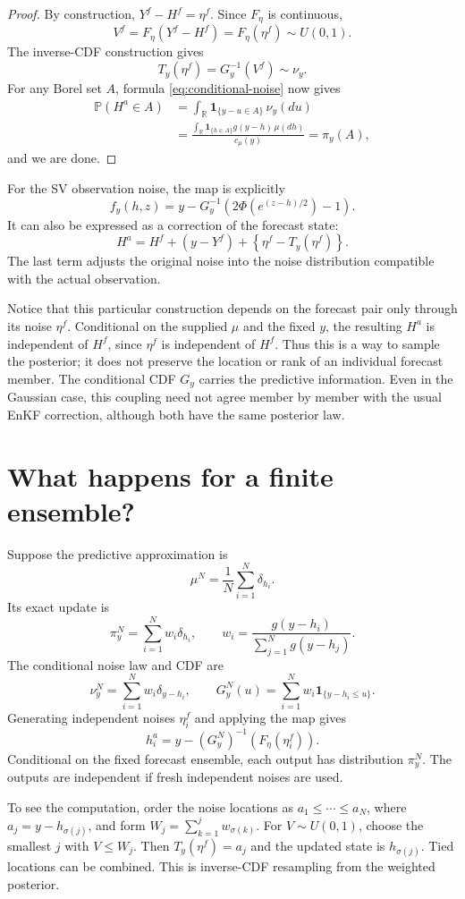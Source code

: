 \documentclass[11pt]{article}
\newcommand{\Pp}{\mathbb P}
\newcommand{\R}{\mathbb R}
\newcommand{\ind}{\mathbf 1}
\begin{document}
\begin{proof}
By construction, $Y^f-H^f=\eta^f$. Since $F_\eta$ is continuous,
\[
V^f=F_\eta(Y^f-H^f)=F_\eta(\eta^f)\sim U(0,1).
\]
The inverse-CDF construction gives
\[
T_y(\eta^f)=G_y^{-1}(V^f)\sim\nu_y.
\]
For any Borel set $A$, formula \eqref{eq:conditional-noise} now gives
\begin{align*}
\Pp(H^a\in A)
&=\int_\R\ind_{\{y-u\in A\}}\,\nu_y(du)\\
&=\frac{\int_\R
\ind_{\{h\in A\}}g(y-h)\,\mu(dh)}{c_\mu(y)}
=\pi_y(A),
\end{align*}
and we are done.
\end{proof}

For the SV observation noise, the map is explicitly
\[
f_y(h,z)
=y-G_y^{-1}\left(2\Phi(e^{(z-h)/2})-1\right).
\]
It can also be expressed as a correction of the forecast state:
\[
H^a
=H^f+(y-Y^f)
+\left\{\eta^f-T_y(\eta^f)\right\}.
\]
The last term adjusts the original noise into the noise distribution
compatible with the actual observation.

Notice that this particular construction depends on the forecast pair
only through its noise $\eta^f$. Conditional on the supplied $\mu$ and
the fixed $y$, the resulting $H^a$ is independent of $H^f$, since $\eta^f$
is independent of $H^f$. Thus this is a way to sample the posterior;
it does not preserve the location or rank of an individual forecast member.
The conditional CDF $G_y$ carries the predictive information. Even in
the Gaussian case, this coupling need not agree member by member with
the usual EnKF correction, although both have the same posterior law.

\section{What happens for a finite ensemble?}

Suppose the predictive approximation is
\[
\mu^N=\frac1N\sum_{i=1}^N\delta_{h_i}.
\]
Its exact update is
\[
\pi_y^N=\sum_{i=1}^N w_i\delta_{h_i},\qquad
w_i=\frac{g(y-h_i)}{\sum_{j=1}^N g(y-h_j)}.
\]
The conditional noise law and CDF are
\[
\nu_y^N=\sum_{i=1}^N w_i\delta_{y-h_i},\qquad
G_y^N(u)=\sum_{i=1}^N w_i\ind_{\{y-h_i\le u\}}.
\]
Generating independent noises $\eta_i^f$ and applying the map gives
\[
h_i^a=y-(G_y^N)^{-1}(F_\eta(\eta_i^f)).
\]
Conditional on the fixed forecast ensemble, each output has distribution
$\pi_y^N$. The outputs are independent if fresh independent noises are used.

To see the computation, order the noise locations as
$a_1\le\cdots\le a_N$, where $a_j=y-h_{\sigma(j)}$, and form
$W_j=\sum_{k=1}^j w_{\sigma(k)}$. For $V\sim U(0,1)$, choose
the smallest $j$ with $V\le W_j$. Then $T_y(\eta^f)=a_j$ and the
updated state is $h_{\sigma(j)}$. Tied locations can be combined.
This is inverse-CDF resampling from the weighted posterior.
\end{document}
